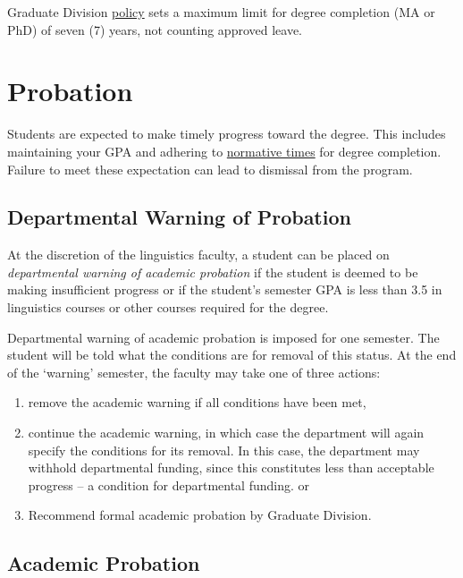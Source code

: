 \documentclass[
]{book}
\providecommand{\tightlist}{%
  \setlength{\itemsep}{0pt}\setlength{\parskip}{0pt}}
\begin{document}
Graduate Division \href{https://manoa.hawaii.edu/graduate/disciplinary-actions/}{policy} sets a maximum limit for degree completion (MA or PhD) of seven (7) years, not counting approved leave.

\hypertarget{probation}{%
\section{Probation}\label{probation}}

Students are expected to make timely progress toward the degree. This includes maintaining your GPA and adhering to \href{time}{normative times} for degree completion. Failure to meet these expectation can lead to dismissal from the program.

\hypertarget{departmental-warning-of-probation}{%
\subsection{Departmental Warning of Probation}\label{departmental-warning-of-probation}}

At the discretion of the linguistics faculty, a student can be placed on \emph{departmental warning of academic probation} if the student is deemed to be making insufficient progress or if the student's semester GPA is less than 3.5 in linguistics courses or other courses required for the degree.

Departmental warning of academic probation is imposed for one semester. The student will be told what the conditions are for removal of this status. At the end of the `warning' semester, the faculty may take one of three actions:

\begin{enumerate}
\def\labelenumi{\arabic{enumi}.}
\tightlist
\item
  remove the academic warning if all conditions have been met,
\item
  continue the academic warning, in which case the department will again specify the conditions for its removal. In this case, the department may withhold departmental funding, since this constitutes less than acceptable progress -- a condition for departmental funding.
  or
\item
  Recommend formal academic probation by Graduate Division.
\end{enumerate}

\hypertarget{academic-probation}{%
\subsection{Academic Probation}\label{academic-probation}}
\end{document}
